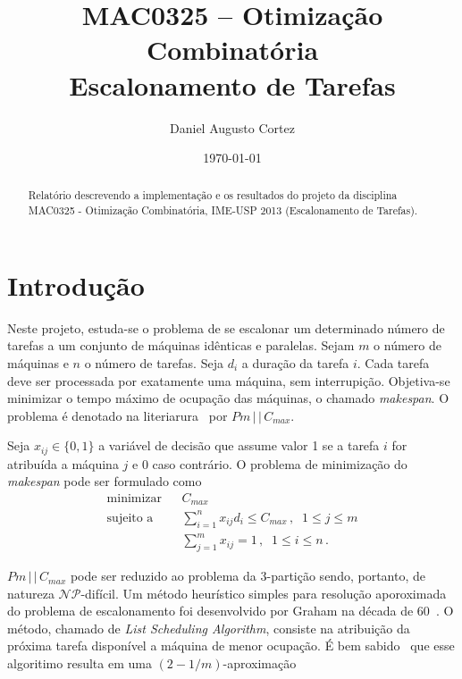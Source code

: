 \documentclass[12pt,a4paper]{article}
\newcommand{\zerar}{\setcounter{equation}{0}\setcounter{figure}{0}\setcounter{table}{0}}
\begin{document}
\title{{\sc MAC0325 -- Otimização Combinatória} \\ 
\vspace{0.5cm} {\bf Escalonamento de Tarefas}}
\author{Daniel Augusto Cortez}
\date{\today}

\maketitle

\begin{abstract}
Relatório descrevendo a implementação e os resultados do projeto da disciplina MAC0325 - Otimização 
Combinatória, IME-USP 2013 (Escalonamento de Tarefas).
\end{abstract}


\zerar
\section{Introdução}
\label{sec:intro}

Neste projeto, estuda-se o problema de se escalonar um determinado número de tarefas a um conjunto 
de máquinas idênticas e paralelas. Sejam $m$ o número de máquinas e $n$ o número de tarefas. Seja
$d_i$ a duração da tarefa $i$. Cada tarefa deve ser processada por exatamente uma máquina, sem 
interrupição. Objetiva-se minimizar o tempo máximo de ocupação das máquinas, o chamado {\it 
makespan}. O problema é denotado na literiarura~\cite{pinedo} por $Pm\,|\,|\,C_{max}$.

Seja $x_{ij} \in \{0, 1\}$ a variável de decisão que assume valor 1 se a tarefa $i$ for
atribuída a máquina $j$ e 0 caso contrário. O problema de minimização do {\it makespan} pode ser
formulado como
%
\begin{eqnarray} \label{eq:modelo}
\text{minimizar} && C_{max} \nonumber \\
\text{sujeito a} 
  && \sum_{i = 1}^{n} x_{ij} d_i \leq C_{max} \, , \;\; 1 \leq j \leq m \\
  && \sum_{j = 1}^{m} x_{ij} = 1 \, , \;\; 1 \leq i \leq n \, . \nonumber
\end{eqnarray}

$Pm\,|\,|\,C_{max}$ pode ser reduzido ao problema da 3-{\sc partição} sendo, portanto, de natureza 
$\mathcal{N}\mathcal{P}$-difícil. Um método heurístico simples para resolução aporoximada do 
problema de escalonamento foi desenvolvido por Graham na década de 60~\cite{graham}. O método, 
chamado de {\it List Scheduling Algorithm}, consiste na atribuição da próxima tarefa disponível a 
máquina de menor ocupação. É bem sabido~\cite{shmoys} que esse algoritimo resulta em uma 
$(2-1/m)$-aproximação
\end{document}
